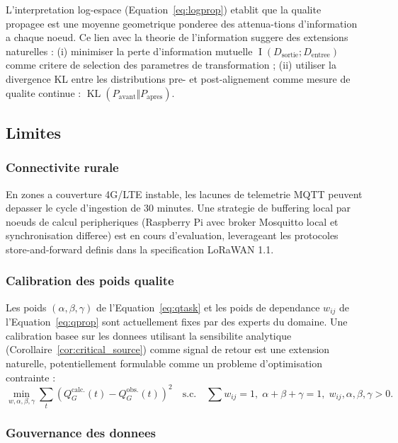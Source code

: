 \documentclass[12pt,a4paper]{article}
\theoremstyle{plain}
\theoremstyle{definition}
\theoremstyle{remark}
\DeclareMathOperator{\KL}{KL}
\DeclareMathOperator{\MI}{I}
\begin{document}
L'interpretation log-espace (Equation~\ref{eq:logprop}) etablit que
la qualite propagee est une moyenne geometrique ponderee des attenua-tions
d'information a chaque noeud. Ce lien avec la theorie de l'information
\cite{shannon_info} suggere des extensions naturelles : (i) minimiser
la perte d'information mutuelle $\MI(D_{\text{sortie}} ; D_{\text{entree}})$
comme critere de selection des parametres de transformation ;
(ii) utiliser la divergence KL entre les distributions pre- et
post-alignement comme mesure de qualite continue :
$\KL(P_{\text{avant}} \Vert P_{\text{apres}})$.

\subsection{Limites}

\subsubsection{Connectivite rurale}

En zones a couverture 4G/LTE instable, les lacunes de telemetrie MQTT
peuvent depasser le cycle d'ingestion de 30 minutes. Une strategie
de buffering local par noeuds de calcul peripheriques (Raspberry Pi
avec broker Mosquitto local et synchronisation differee) est en cours
d'evaluation, leverageant les protocoles store-and-forward definis
dans la specification LoRaWAN 1.1.

\subsubsection{Calibration des poids qualite}

Les poids $(\alpha,\beta,\gamma)$ de l'Equation~\eqref{eq:qtask} et
les poids de dependance $w_{ij}$ de l'Equation~\eqref{eq:qprop} sont
actuellement fixes par des experts du domaine. Une calibration basee
sur les donnees utilisant la sensibilite analytique
(Corollaire~\ref{cor:critical_source}) comme signal de retour est une
extension naturelle, potentiellement formulable comme un probleme
d'optimisation contrainte :
\begin{equation}
\min_{w,\alpha,\beta,\gamma}
\sum_t \left(Q_G^{\text{calc.}}(t) - Q_G^{\text{obs.}}(t)\right)^2
\quad \text{s.c.} \quad
\sum w_{ij}=1,\; \alpha+\beta+\gamma=1,\; w_{ij},\alpha,\beta,\gamma>0.
\label{eq:weight_optim}
\end{equation}

\subsubsection{Gouvernance des donnees}
\end{document}
